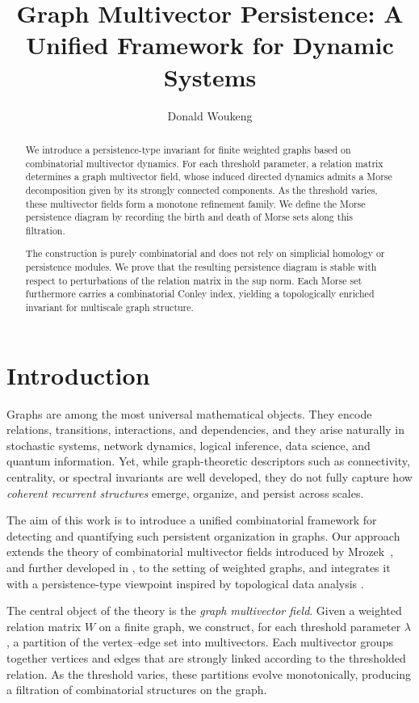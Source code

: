 \documentclass{article}
\title{Graph Multivector Persistence: A Unified Framework for Dynamic Systems}
\author{Donald Woukeng}
\affil{African Institute For Mathematical Science (AIMS)\\

Kigali, Rwanda.\\ 
donald.woukeng@aims.ac.rw}
\date{}
\theoremstyle{definition}
\theoremstyle{plain}
\theoremstyle{remark}
\newcommand{\1}{\mathbbm{1}}  %
\begin{document}
\maketitle
\begin{abstract}
We introduce a persistence-type invariant for finite weighted graphs
based on combinatorial multivector dynamics. 
For each threshold parameter, a relation matrix determines a graph
multivector field, whose induced directed dynamics admits a
Morse decomposition given by its strongly connected components.
As the threshold varies, these multivector fields form a monotone
refinement family. 
We define the Morse persistence diagram by recording the birth and
death of Morse sets along this filtration.

The construction is purely combinatorial and does not rely on
simplicial homology or persistence modules. 
We prove that the resulting persistence diagram is stable with respect
to perturbations of the relation matrix in the sup norm.
Each Morse set furthermore carries a combinatorial Conley index,
yielding a topologically enriched invariant for multiscale graph
structure.
\end{abstract}\section{Introduction}

Graphs are among the most universal mathematical objects. 
They encode relations, transitions, interactions, and dependencies,
and they arise naturally in stochastic systems, network dynamics,
logical inference, data science, and quantum information.
Yet, while graph-theoretic descriptors such as connectivity,
centrality, or spectral invariants are well developed,
they do not fully capture how \emph{coherent recurrent structures}
emerge, organize, and persist across scales.

The aim of this work is to introduce a unified combinatorial framework
for detecting and quantifying such persistent organization in graphs.
Our approach extends the theory of combinatorial multivector fields
introduced by Mrozek~\cite{mrozek2017conley}, and further developed in
\cite{Woukeng_2024,cote2025data}, to the setting of weighted graphs,
and integrates it with a persistence-type viewpoint inspired by
topological data analysis \cite{cohen2005stability,chazal2016structure}.

The central object of the theory is the \emph{graph multivector field}.  
Given a weighted relation matrix $W$ on a finite graph,
we construct, for each threshold parameter $\lambda$,
a partition of the vertex--edge set into multivectors.
Each multivector groups together vertices and edges that are strongly
linked according to the thresholded relation.
As the threshold varies, these partitions evolve monotonically,
producing a filtration of combinatorial structures on the graph.
\end{document}
